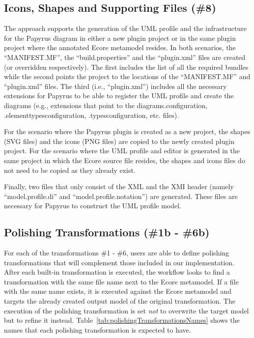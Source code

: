 \subsection{Icons, Shapes and Supporting Files (\#8)}
\label{sec:supportingFiles}
The approach supports the generation of the UML profile and the infrastructure for the Papyrus diagram in either a new plugin project or in the same plugin project where the annotated Ecore metamodel resides. 
In both scenarios, the ``MANIFEST.MF'', the ``build.properties'' and the ``plugin.xml'' files are created (or overridden respectively). 
The first includes the list of all the required bundles while the second points the project to the locations of the ``MANIFEST.MF'' and ``plugin.xml'' files. 
The third (i.e., ``plugin.xml'') includes all the necessary extensions for Papyrus to be able to register the UML profile and create the diagrams (e.g., extensions that point to the diagrams.configuration, .elementtypesconfiguration, .typesconfiguration, etc. files). 

For the scenario where the Papyrus plugin is created as a new project, the shapes (SVG files) and the icons (PNG files) are copied to the newly created 
plugin project. 
For the scenario where the UML profile and editor is generated in the same project in which the Ecore source file resides, the shapes and icons files do not need to be copied as they already exist.

Finally, two files that only consist of the XML and the XMI header (namely ``model.profile.di'' and ``model.profile.notation'') are generated. These files are necessary for Papyrus to construct the UML profile model.

\subsection{Polishing Transformations (\#1b - \#6b)}
\label{sec:transformationPatches}
For each of the transformations \#1 - \#6, users are able to define polishing transformations that will complement those included in our implementation. After each built-in transformation is executed, the workflow looks to find a transformation with the same file name next to the Ecore metamodel. 
If a file with the same name exists, it is executed against the Ecore metamodel and targets the already created output model of the original transformation. 
The execution of the polishing transformation is set \textit{not} to overwrite the target model but to refine it instead.
Table~\ref{tab:polishingTransformationsNames} shows the names that each polishing transformation is expected to have.


